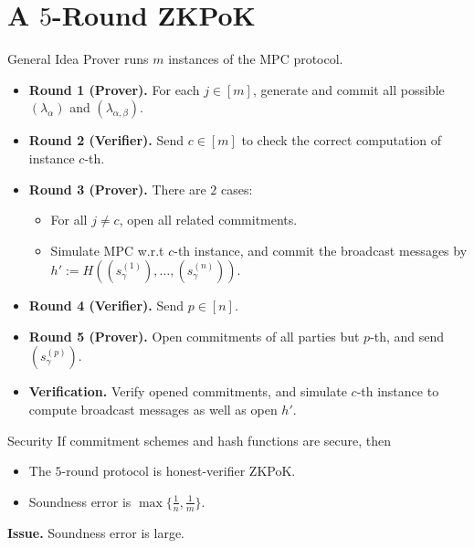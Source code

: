 \documentclass{beamer}
\begin{document}
	\section{A $5$-Round ZKPoK}
	\begin{frame}{General Idea} 
		Prover runs $m$ instances of the MPC protocol.
		\begin{itemize}
			\item \textbf{Round 1 (Prover).} For each $j \in [m]$, generate and commit all possible $(\lambda_\alpha)$ and $(\lambda_{\alpha,\beta})$.
			\item \textbf{Round 2 (Verifier).} Send $c \in [m]$ to check the correct computation of instance $c$-th.
			\item \textbf{Round 3 (Prover).} There are $2$ cases:
			\begin{itemize}
				\item For all $j \neq c$, open all related commitments.
				\item Simulate MPC w.r.t $c$-th instance, and commit the broadcast messages by $h' := H\left((s_\gamma^{(1)}), \dots, (s_\gamma^{(n)})\right)$.
			\end{itemize}
			\item \textbf{Round 4 (Verifier).} Send $p \in [n]$.
			\item \textbf{Round 5 (Prover).} Open commitments of all parties but $p$-th, and send $(s_\gamma^{(p)})$.
			\item \textbf{Verification.} Verify opened commitments, and simulate $c$-th instance to compute broadcast messages as well as open $h'$.
		\end{itemize}
	\end{frame}

	\begin{frame}{Security}
		If commitment schemes and hash functions are secure, then 
		\begin{itemize}
			\item The $5$-round protocol is honest-verifier ZKPoK.
			\item Soundness error is $\max\{\frac{1}{n}, \frac{1}{m}\}$.
		\end{itemize}
		\textbf{Issue.} Soundness error is large.
	\end{frame}
\end{document}
